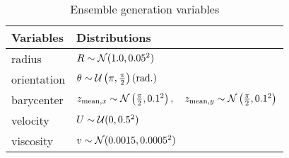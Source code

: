 \begin{table}[htbp]
    \centering
    \caption{Ensemble generation variables}
    \begin{tabular}[t]{|l|l|}
        \hline
        Variables   & Distributions                                                                                                           \\
        \hline
        radius      & $R \sim \mathcal N(1.0, 0.05^2)$                                                                                               \\
        orientation & $\theta \sim \mathcal U\left(\pi, \frac\pi2 \right) (\text{rad.}) $                                                            \\
        barycenter  & $z_{\text{mean},x} \sim \mathcal N\left(\frac\pi2,0.1^2\right), \quad z_{\text{mean},y} \sim \mathcal N\left(\frac\pi2,0.1^2\right) $ \\
        velocity    & $U \sim \mathcal U(0, 0.5^2) $                                                                                                 \\
        viscosity   & $v \sim \mathcal N(0.0015, 0.0005^2)$                                                                                          \\
        \hline
    \end{tabular}
    \label{tab:ens_dipole}
\end{table}

\newpage